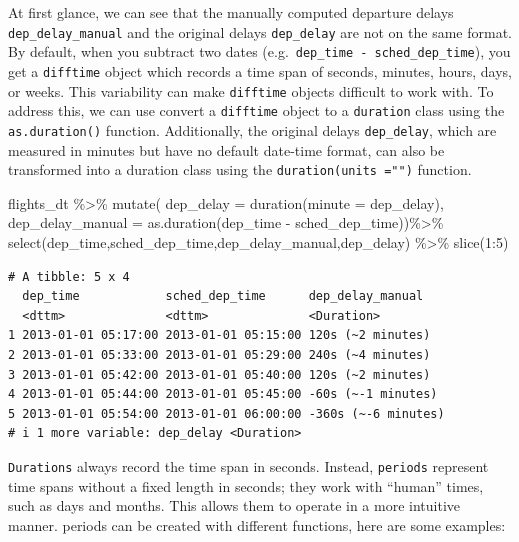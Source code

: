 \documentclass[
  letterpaper,
  DIV=11,
  numbers=noendperiod]{scrartcl}
\newenvironment{Shaded}{\begin{snugshade}}{\end{snugshade}}
\newcommand{\AttributeTok}[1]{\textcolor[rgb]{0.40,0.45,0.13}{#1}}
\newcommand{\DecValTok}[1]{\textcolor[rgb]{0.68,0.00,0.00}{#1}}
\newcommand{\FunctionTok}[1]{\textcolor[rgb]{0.28,0.35,0.67}{#1}}
\newcommand{\NormalTok}[1]{\textcolor[rgb]{0.00,0.23,0.31}{#1}}
\newcommand{\SpecialCharTok}[1]{\textcolor[rgb]{0.37,0.37,0.37}{#1}}
\begin{document}
At first glance, we can see that the manually computed departure delays
\texttt{dep\_delay\_manual} and the original delays \texttt{dep\_delay}
are not on the same format. By default, when you subtract two dates
(e.g.~\texttt{dep\_time\ -\ sched\_dep\_time}), you get a
\texttt{difftime} object which records a time span of seconds, minutes,
hours, days, or weeks. This variability can make \texttt{difftime}
objects difficult to work with. To address this, we can use convert a
\texttt{difftime} object to a \texttt{duration} class using the
\texttt{as.duration()} function. Additionally, the original delays
\texttt{dep\_delay}, which are measured in minutes but have no default
date-time format, can also be transformed into a duration class using
the \texttt{duration(units\ ="")} function.

\begin{Shaded}
\begin{Highlighting}[]
\NormalTok{ flights\_dt }\SpecialCharTok{\%\textgreater{}\%}
  \FunctionTok{mutate}\NormalTok{(}
      \AttributeTok{dep\_delay =} \FunctionTok{duration}\NormalTok{(}\AttributeTok{minute  =}\NormalTok{ dep\_delay),}
      \AttributeTok{dep\_delay\_manual =}  \FunctionTok{as.duration}\NormalTok{(dep\_time }\SpecialCharTok{{-}}\NormalTok{ sched\_dep\_time))}\SpecialCharTok{\%\textgreater{}\%}
  \FunctionTok{select}\NormalTok{(dep\_time,sched\_dep\_time,dep\_delay\_manual,dep\_delay)  }\SpecialCharTok{\%\textgreater{}\%}
  \FunctionTok{slice}\NormalTok{(}\DecValTok{1}\SpecialCharTok{:}\DecValTok{5}\NormalTok{)}
\end{Highlighting}
\end{Shaded}

\begin{verbatim}
# A tibble: 5 x 4
  dep_time            sched_dep_time      dep_delay_manual   
  <dttm>              <dttm>              <Duration>         
1 2013-01-01 05:17:00 2013-01-01 05:15:00 120s (~2 minutes)  
2 2013-01-01 05:33:00 2013-01-01 05:29:00 240s (~4 minutes)  
3 2013-01-01 05:42:00 2013-01-01 05:40:00 120s (~2 minutes)  
4 2013-01-01 05:44:00 2013-01-01 05:45:00 -60s (~-1 minutes) 
5 2013-01-01 05:54:00 2013-01-01 06:00:00 -360s (~-6 minutes)
# i 1 more variable: dep_delay <Duration>
\end{verbatim}

\texttt{Durations} always record the time span in seconds. Instead,
\texttt{periods} represent time spans without a fixed length in seconds;
they work with ``human'' times, such as days and months. This allows
them to operate in a more intuitive manner. periods can be created with
different functions, here are some examples:
\end{document}
